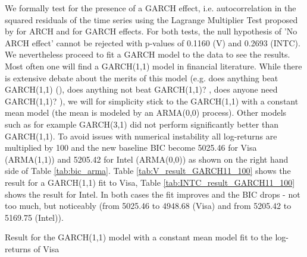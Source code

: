 We formally test for the presence of a GARCH effect, i.e. autocorrelation in the squared residuals of the time series using the Lagrange Multiplier Test proposed by \citet{engle_autoregressive_1982} for ARCH and \citet{lee_lagrange_1991} for GARCH effects. For both tests, the null hypothesis of 'No ARCH effect' cannot be rejected with p-values of 0.1160 (V) and 0.2693 (INTC). We nevertheless proceed to fit a GARCH model to the data to see the results. Most often one will find a GARCH(1,1) model in financial literature. While there is extensive debate about the merits of this model (e.g. does anything beat GARCH(1,1) (\cite{hansen_forecast_2005}), does anything not beat GARCH(1,1)? \citep{alexios_does_2013}, does anyone need GARCH(1,1)? \citep{reschenhofer_does_2013}), we will for simplicity stick to the GARCH(1,1) with a constant mean model (the mean is modeled by an ARMA(0,0) process). Other models such as for example GARCH(3,1) did not perform significantly better than GARCH(1,1). To avoid issues with numerical instability all log-returns are multiplied by 100 and the new baseline BIC become 5025.46 for Visa (ARMA(1,1)) and 5205.42 for Intel (ARMA(0,0)) as shown on the right hand side of Table \ref{tab:bic_arma}. Table \ref{tab:V_result_GARCH11_100} shows the result for a GARCH(1,1) fit to Visa, Table \ref{tab:INTC_result_GARCH11_100} shows the result for Intel. In both cases the fit improves and the BIC drops - not too much, but noticeably (from 5025.46 to 4948.68 (Visa) and from 5205.42 to 5169.75 (Intel)). 

\begin{table}[h!]
    \centering
    \vspace{-2ex}
    \small
    
    \caption{Result for the GARCH(1,1) model with a constant mean model fit to the log-returns of Visa}
    \label{tab:V_result_GARCH11_100}
\end{table}{}

